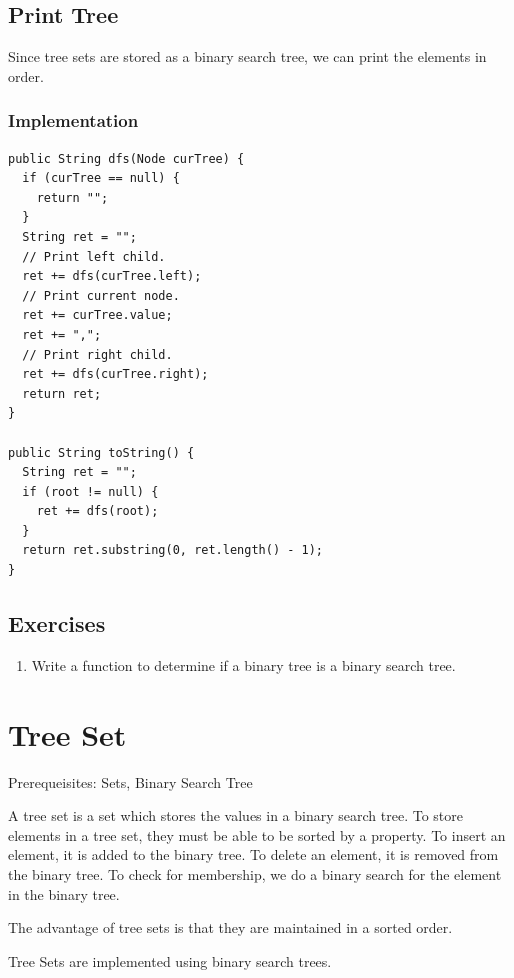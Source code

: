 \documentclass[11pt,oneside]{book}
\begin{document}
\subsection{Print Tree}

Since tree sets are stored as a binary search tree, we can print the elements in order.

\subsubsection{Implementation}

\begin{lstlisting}
public String dfs(Node curTree) {
  if (curTree == null) {
    return "";
  }
  String ret = "";
  // Print left child.
  ret += dfs(curTree.left);
  // Print current node.
  ret += curTree.value;
  ret += ",";
  // Print right child.
  ret += dfs(curTree.right);
  return ret;
}
    
public String toString() {
  String ret = "";
  if (root != null) {
    ret += dfs(root);
  }
  return ret.substring(0, ret.length() - 1);
}
\end{lstlisting}

\subsection{Exercises}

\begin{enumerate}
\item Write a function to determine if a binary tree is a binary search tree.
\end{enumerate}

        \section{ Tree Set }
        

Prerequeisites: Sets, Binary Search Tree



A tree set is a set which stores the values in a binary search tree. To store elements in a tree set, they must be able to be sorted by a property. To insert an element, it is added to the binary tree. To delete an element, it is removed from the binary tree. To check for membership, we do a binary search for the element in the binary tree.

The advantage of tree sets is that they are maintained in a sorted order.

Tree Sets are implemented using binary search trees.
\end{document}
